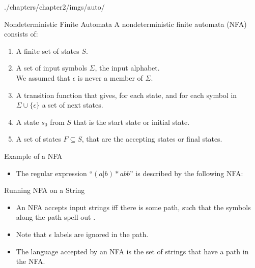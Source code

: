 \begin{graphicspathcontext}{{./chapters/chapter2/imgs/auto/}}
\begin{bibunit}[apalike]
\begin{frame}{Nondeterministic Finite Automata}
	A nondeterministic finite automata (NFA) consists of:
	\begin{enumerate}
	\item A finite set of states $S$.
	\vfill
	\item A set of input symbols $\Sigma$, the input alphabet. \\
		We assumed that $\epsilon$ is never a member of $\Sigma$.
	\vfill
	\item A transition function that gives, for each state, and for each symbol in $\Sigma\cup\{\epsilon\}$ a set of next states.
	\vfill
	\item A state $s_0$ from $S$ that is the start state or initial state.
	\vfill
	\item A set of states $F \subseteq S$, that are the accepting states or final states.
	\end{enumerate}
\end{frame}


\begin{frame}{Example of a NFA}
	\begin{itemize}
	\item The regular expression ``$(a|b)*abb$'' is described by the following NFA:
	\end{itemize}
	\vfill
	\begin{center}
	\end{center}
\end{frame}

\begin{frame}{Running NFA on a String}
	\begin{itemize}
	\item An NFA accepts input strings  iff there is some path, such that the symbols along the path spell out .
	\vfill
	\item Note that $\epsilon$ labels are ignored in the path.
	\vfill
	\item The language accepted by an NFA is the set of strings that have a path in the NFA.
	\end{itemize}
\end{frame}


\end{bibunit}
\end{graphicspathcontext}
